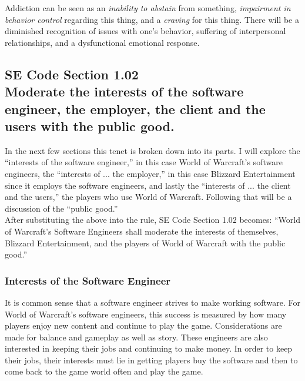 \documentclass[11pt]{article}
\begin{document}
\begin{multicols}{2}
Addiction can be seen as an \emph{inability to abstain} from something, \emph{impairment in behavior control} regarding this thing, and a \emph{craving} for this thing. There will be a diminished recognition of issues with one's behavior, suffering of interpersonal relationships, and a dysfunctional emotional response. \cite{DefinitionOfAddiction}

\subsection{SE Code Section 1.02\\Moderate the interests of the software engineer, the employer, the client and the users with the public good.}
In the next few sections this tenet is broken down into its parts. I will explore the ``interests of the software engineer,'' in this case World of Warcraft's software engineers, the ``interests of ... the employer,'' in this case Blizzard Entertainment since it employs the software engineers, and lastly the ``interests of ... the client and the users,'' the players who use World of Warcraft. Following that will be a discussion of the ``public good.''\\
After substituting the above into the rule, SE Code Section 1.02 becomes: ``World of Warcraft's Software Engineers shall moderate the interests of themselves, Blizzard Entertainment, and the players of World of Warcraft with the public good.''

\subsubsection{Interests of the Software Engineer}
It is common sense that a software engineer strives to make working software. For World of Warcraft's software engineers, this success is measured by how many players enjoy new content and continue to play the game. Considerations are made for balance and gameplay as well as story. \cite{DevWatercooler} These engineers are also interested in keeping their jobs and continuing to make money. In order to keep their jobs, their interests must lie in getting players buy the software and then to come back to the game world often and play the game.


\end{multicols}
\end{document}
